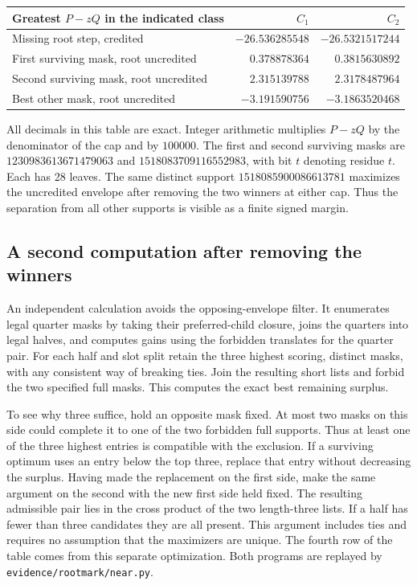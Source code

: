 \documentclass[12pt,letterpaper]{article}
\begin{document}
\begin{center}\small
\begin{tabular}{@{}lrr@{}}
\toprule
Greatest \(P-zQ\) in the indicated class & \(C_1\) & \(C_2\)\\
\midrule
Missing root step, credited & \(-26.536285548\) & \(-26.5321517244\)\\
First surviving mask, root uncredited & \(0.378878364\) & \(0.3815630892\)\\
Second surviving mask, root uncredited & \(2.315139788\) & \(2.3178487964\)\\
Best other mask, root uncredited & \(-3.191590756\) & \(-3.1863520468\)\\
\bottomrule
\end{tabular}
\end{center}

All decimals in this table are exact. Integer arithmetic multiplies \(P-zQ\) by the denominator of the cap and by \(100000\). The first and second surviving masks are \(1230983613671479063\) and \(1518083709116552983\), with bit \(t\) denoting residue \(t\). Each has 28 leaves. The same distinct support \(1518085900086613781\) maximizes the uncredited envelope after removing the two winners at either cap. Thus the separation from all other supports is visible as a finite signed margin.

\subsection{A second computation after removing the winners}

An independent calculation avoids the opposing-envelope filter. It enumerates legal quarter masks by taking their preferred-child closure, joins the quarters into legal halves, and computes gains using the forbidden translates for the quarter pair. For each half and slot split retain the three highest scoring, distinct masks, with any consistent way of breaking ties. Join the resulting short lists and forbid the two specified full masks. This computes the exact best remaining surplus.

To see why three suffice, hold an opposite mask fixed. At most two masks on this side could complete it to one of the two forbidden full supports. Thus at least one of the three highest entries is compatible with the exclusion. If a surviving optimum uses an entry below the top three, replace that entry without decreasing the surplus. Having made the replacement on the first side, make the same argument on the second with the new first side held fixed. The resulting admissible pair lies in the cross product of the two length-three lists. If a half has fewer than three candidates they are all present. This argument includes ties and requires no assumption that the maximizers are unique. The fourth row of the table comes from this separate optimization. Both programs are replayed by \texttt{evidence/rootmark/near.py}.
\end{document}
